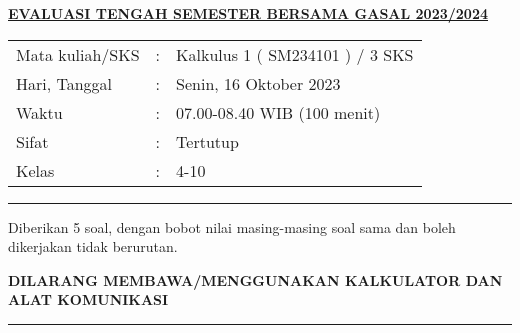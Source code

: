 \documentclass[10pt,openany,a4paper]{article}
\begin{document}
    \begin{center}
	{\underline{\textbf{\MakeUppercase{Evaluasi Tengah Semester Bersama Gasal 2023/2024}}}}
    \end{center}

    \begin{center}
	\begin{tabular}{lcl}
		Mata kuliah/SKS & : & Kalkulus 1 ( SM234101 ) / 3 SKS\\
		Hari, Tanggal & : & Senin, 16 Oktober 2023\\
		Waktu & : & 07.00-08.40 WIB (100 menit)\\
		Sifat & : & Tertutup\\
		Kelas & : & 4-10
	\end{tabular}
    \end{center}
	
    \noindent\rule{\textwidth}{2.pt}
	
    \setlength{\parindent}{5pt}
    \par Diberikan 5 soal, dengan bobot nilai masing-masing soal sama dan boleh dikerjakan tidak berurutan.
    \setlength{\parindent}{5pt}
    \setlength{\parindent}{5pt}
    {\small
    \par \textbf{\MakeUppercase{Dilarang membawa/menggunakan kalkulator dan alat komunikasi}}
    }
    \par {}
	
    \noindent\rule{\textwidth}{2.pt}
	
\end{document}

